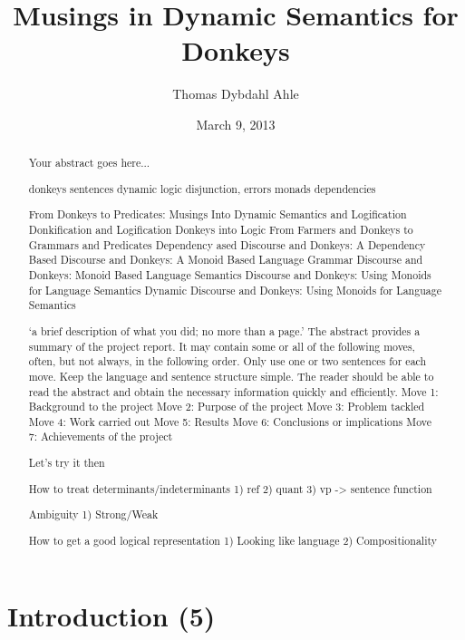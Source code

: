 \documentclass[12pt]{article}
\title{Musings in Dynamic Semantics for Donkeys}
\author{Thomas Dybdahl Ahle}
\date{March 9, 2013}
\let\stdsection\section
\renewcommand\section{\newpage\stdsection}
\begin{document}
\maketitle

\begin{abstract}
Your abstract goes here...

donkeys sentences
dynamic logic
disjunction, errors
monads
dependencies

From Donkeys to Predicates: Musings Into Dynamic Semantics and Logification
Donkification and Logification
Donkeys into Logic
From Farmers and Donkeys to Grammars and Predicates
Dependency ased
Discourse and Donkeys: A Dependency Based 
Discourse and Donkeys: A Monoid Based Language Grammar
Discourse and Donkeys: Monoid Based Language Semantics
Discourse and Donkeys: Using Monoids for Language Semantics
Dynamic Discourse and Donkeys: Using Monoids for Language Semantics


‘a brief description of what you did; no more than a page.’
The abstract provides a summary of the project report. It may contain some or all of the following moves, 
often, but not always, in the following order. Only use one or two sentences for each move. Keep the 
language and sentence structure simple. The reader should be able to read the abstract and obtain the 
necessary information quickly and efficiently.
Move 1:  Background to the project
Move 2: Purpose of the project
Move 3: Problem tackled
Move 4: Work carried out
Move 5: Results 
Move 6: Conclusions or implications
Move 7: Achievements of the project

Let's try it then

How to treat determinants/indeterminants
  1) ref
  2) quant
  3) vp -> sentence function

Ambiguity
  1) Strong/Weak

How to get a good logical representation
  1) Looking like language
  2) Compositionality

\end{abstract}

\tableofcontents


\section{Introduction (5)}

\end{document}
